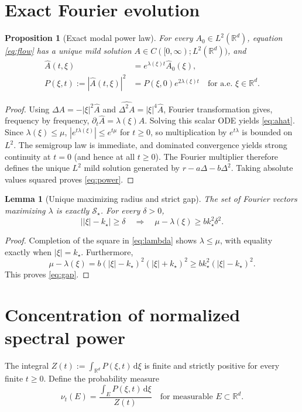 \documentclass[11pt]{article}
\newtheorem{lemma}[theorem]{Lemma}
\newtheorem{proposition}[theorem]{Proposition}
\theoremstyle{remark}
\newcommand{\R}{\mathbb R}
\newcommand{\Sstar}{\mathcal S_\star}
\newcommand{\abs}[1]{\left\lvert#1\right\rvert}
\newcommand{\dd}{\,\mathrm d}
\begin{document}
\section{Exact Fourier evolution}
\begin{proposition}[Exact modal power law]\label{prop:exact}
For every $A_0\in L^2(\R^d)$, equation \eqref{eq:flow} has a
unique mild solution $A\in C([0,\infty);L^2(\R^d))$, and
\begin{align}
 \widehat A(t,\xi)&=e^{\lambda(\xi)t}\widehat A_0(\xi),
 \label{eq:ahat}\\
 P(\xi,t):=\abs{\widehat A(t,\xi)}^2
 &=P(\xi,0)e^{2\lambda(\xi)t}
 \quad\text{for a.e. }\xi\in\R^d.
 \label{eq:power}
\end{align}
\end{proposition}
\begin{proof}
Using
$\widehat{\Delta A}=-\abs\xi^2\widehat A$ and
$\widehat{\Delta^2 A}=\abs\xi^4\widehat A$,
Fourier transformation gives, frequency by frequency,
$\partial_t\widehat A=\lambda(\xi)\widehat A$.
Solving this scalar ODE yields \eqref{eq:ahat}.
Since $\lambda(\xi)\le\mu$,
$\abs{e^{t\lambda(\xi)}}\le e^{t\mu}$ for $t\ge0$,
so multiplication by $e^{t\lambda}$ is bounded on $L^2$.
The semigroup law is immediate, and dominated convergence yields
strong continuity at $t=0$ (and hence at all $t\ge0$).
The Fourier multiplier therefore defines the unique $L^2$ mild
solution generated by $r-a\Delta-b\Delta^2$.
Taking absolute values squared proves \eqref{eq:power}.
\end{proof}

\begin{lemma}[Unique maximizing radius and strict gap]\label{lem:gap}
The set of Fourier vectors maximizing $\lambda$ is exactly $\Sstar$.
For every $\delta>0$,
\begin{equation}\label{eq:gap}
 \bigl\lvert\abs\xi-k_\star\bigr\rvert\ge\delta
 \quad\Longrightarrow\quad
 \mu-\lambda(\xi)\ge bk_\star^2\delta^2.
\end{equation}
\end{lemma}
\begin{proof}
Completion of the square in \eqref{eq:lambda} shows
$\lambda\le\mu$, with equality exactly when
$\abs\xi=k_\star$. Furthermore,
\[
 \mu-\lambda(\xi)
 =b(\abs\xi-k_\star)^2(\abs\xi+k_\star)^2
 \ge bk_\star^2(\abs\xi-k_\star)^2.
\]
This proves \eqref{eq:gap}.
\end{proof}

\section{Concentration of normalized spectral power}
The integral $Z(t):=\int_{\R^d}P(\xi,t)\dd\xi$ is finite and
strictly positive for every finite $t\ge0$. Define the probability
measure
\begin{equation}\label{eq:nu}
 \nu_t(E)=\frac{\int_E P(\xi,t)\dd\xi}{Z(t)}
 \quad\text{for measurable }E\subset\R^d.
\end{equation}
\end{document}
